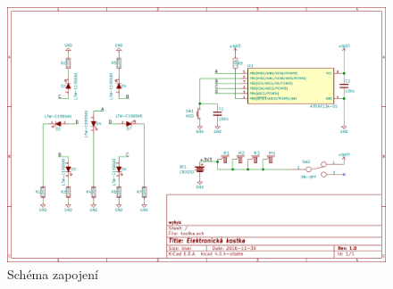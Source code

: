 \begin{figure}[H]
  \centering
  \includegraphics[width=\textwidth]{../design/sch_doc.pdf}
  \caption{Schéma zapojení}
  \label{img:1}
\end{figure}
  
